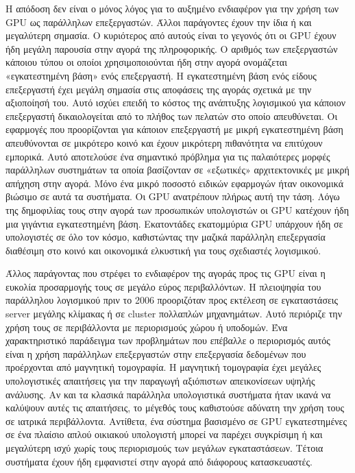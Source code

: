 Η απόδοση δεν είναι ο μόνος λόγος για το αυξημένο ενδιαφέρον για την χρήση των GPU ως παράλληλων επεξεργαστών. Άλλοι παράγοντες έχουν την ίδια ή και μεγαλύτερη σημασία. Ο κυριότερος από αυτούς είναι το γεγονός ότι οι GPU έχουν ήδη μεγάλη παρουσία στην αγορά της πληροφορικής. Ο αριθμός των επεξεργαστών κάποιου τύπου οι οποίοι χρησιμοποιούνται ήδη στην αγορά ονομάζεται «εγκατεστημένη βάση» ενός επεξεργαστή. Η εγκατεστημένη βάση ενός είδους επεξεργαστή έχει μεγάλη σημασία στις αποφάσεις της αγοράς σχετικά με την αξιοποίησή του. Αυτό ισχύει επειδή το κόστος της ανάπτυξης λογισμικού για κάποιον επεξεργαστή δικαιολογείται από το πλήθος των πελατών στο οποίο απευθύνεται. Οι εφαρμογές που προορίζονται για κάποιον επεξεργαστή με μικρή εγκατεστημένη βάση απευθύνονται σε μικρότερο κοινό και έχουν μικρότερη πιθανότητα να επιτύχουν εμπορικά. Αυτό αποτελούσε ένα σημαντικό πρόβλημα για τις παλαιότερες μορφές παράλληλων συστημάτων τα οποία βασίζονταν σε «εξωτικές» αρχιτεκτονικές με μικρή απήχηση στην αγορά. Μόνο ένα μικρό 
ποσοστό ειδικών εφαρμογών ήταν οικονομικά βιώσιμο σε αυτά τα συστήματα. Οι GPU ανατρέπουν πλήρως αυτή την τάση. Λόγω της δημοφιλίας τους στην αγορά των προσωπικών υπολογιστών οι GPU κατέχουν ήδη μια γιγάντια εγκατεστημένη βάση. Εκατοντάδες εκατομμύρια GPU υπάρχουν ήδη σε  υπολογιστές σε όλο τον κόσμο, καθιστώντας την μαζικά παράλληλη επεξεργασία διαθέσιμη στο κοινό και οικονομικά ελκυστική για τους σχεδιαστές λογισμικού.

Άλλος παράγοντας που στρέφει το ενδιαφέρον της αγοράς προς τις GPU είναι η ευκολία προσαρμογής τους σε μεγάλο εύρος περιβαλλόντων. Η πλειοψηφία του παράλληλου λογισμικού πριν το 2006 προοριζόταν προς εκτέλεση σε  εγκαταστάσεις server μεγάλης κλίμακας ή σε cluster πολλαπλών μηχανημάτων. Αυτό περιόριζε την χρήση τους σε περιβάλλοντα με περιορισμούς χώρου ή υποδομών. Ένα χαρακτηριστικό παράδειγμα των προβλημάτων που επέβαλλε ο περιορισμός αυτός είναι η χρήση παράλληλων επεξεργαστών στην επεξεργασία δεδομένων που προέρχονται από μαγνητική τομογραφία. Η μαγνητική τομογραφία έχει μεγάλες υπολογιστικές απαιτήσεις για την παραγωγή αξιόπιστων απεικονίσεων υψηλής ανάλυσης. Αν και τα κλασικά παράλληλα υπολογιστικά συστήματα ήταν ικανά να καλύψουν αυτές τις απαιτήσεις, το μέγεθός τους καθιστούσε αδύνατη την χρήση τους σε ιατρικά περιβάλλοντα. Αντίθετα, ένα σύστημα βασισμένο σε GPU εγκατεστημένες σε ένα πλαίσιο απλού οικιακού υπολογιστή μπορεί να παρέχει συγκρίσιμη ή και μεγαλύτερη ισχύ χωρίς τους περιορισμούς των 
μεγάλων εγκαταστάσεων. Τέτοια συστήματα έχουν ήδη εμφανιστεί στην αγορά από διάφορους κατασκευαστές.      

